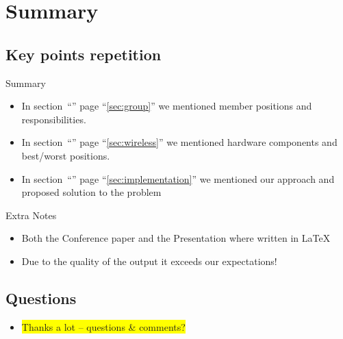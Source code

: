\section{Summary}
  \subsection{Key points repetition}

\begin{frame}
  \begin{exampleblock}{Summary}
    \begin{itemize}[<+->]
      \item In section~``'' page ``\ref{sec:group}'' we mentioned member positions and responsibilities. 
      \item In section~``'' page ``\ref{sec:wireless}'' we mentioned hardware components and best/worst positions.
      \item In section~``'' page ``\ref{sec:implementation}'' we mentioned our approach and proposed solution to the problem \pause
    \end{itemize}
  \end{exampleblock}
  \begin{exampleblock}{Extra Notes}
    \begin{itemize}[<+->]
      \item Both the Conference paper and the Presentation where written in \alert{\LaTeX}
      \item Due to the quality of the output it exceeds our expectations!~\cite{research}
    \end{itemize}
  \end{exampleblock}
\end{frame}

\subsection*{Questions}
\begin{frame}
  \begin{itemize}
     \Large
    \item \colorbox{yellow}{Thanks a lot – questions \& comments?}
  \end{itemize} 
\end{frame}
